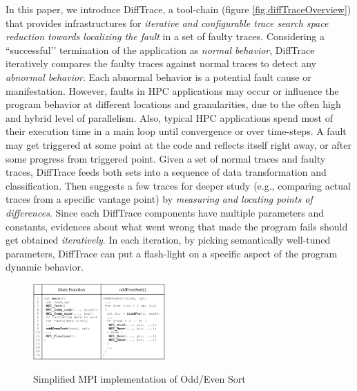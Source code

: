 In this paper, we introduce DiffTrace, a tool-chain (figure \ref{fig.diffTraceOverview}) that provides infrastructures for \textit{iterative and configurable trace search space reduction towards localizing the fault} in a set of faulty traces.
%
Considering a ``successful’’ termination of the application as \textit{normal behavior}, DiffTrace iteratively compares the faulty traces against normal traces to detect any \textit{abnormal behavior}.
%
Each abnormal behavior is a potential fault cause or manifestation.
%
However, faults in HPC applications may occur or influence the program behavior at different locations and granularities, due to the often high and hybrid level of parallelism.
%
Also, typical HPC applications spend most of their execution time in a main loop until convergence or over time-steps.
%
A fault may get triggered at some point at the code and reflects itself right away, or after some progress from triggered point. 
%
Given a set of normal traces and faulty traces, DiffTrace feeds both sets into a sequence of data transformation and classification. Then suggests a few traces for deeper study (e.g., comparing actual traces from a specific vantage point) by \textit{measuring and locating points of differences}.
%
Since each DiffTrace components have multiple parameters and constants, evidences about what went wrong that made the program fails should get obtained \textit{iteratively}. In each iteration, by picking semantically well-tuned parameters, DiffTrace can put a flash-light on a specific aspect of the program dynamic behavior.
%

\begin{figure}[]
\centering
\caption{Simplified MPI implementation of Odd/Even Sort}
\includegraphics[width=0.45\textwidth]{figs/oddEven.png}
\label{fig.oddEven}
\end{figure}

